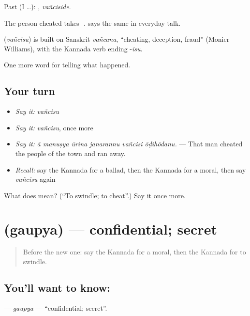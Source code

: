 Past (I …): , \emph{vañciside}.

The person cheated takes -.   says the same in everyday talk.

\begin{cousinweb}
\textbf{} (\emph{vañcisu}) is built on Sanskrit \emph{vañcana}, \textquotedblleft{}cheating, deception, fraud\textquotedblright{} (Monier-Williams), with the Kannada verb ending -\emph{isu}.
\end{cousinweb}

\begin{grammarlens}[title={What you've built}]
One more word for telling what happened.
\end{grammarlens}

\subsection*{Your turn}
\begin{itemize}
\raggedright
  \item \emph{Say it:} \emph{vañcisu}
  \item \emph{Say it:} \emph{vañcisu}, once more
  \item \emph{Say it:} \emph{ā manuṣya ūrina janarannu vañcisi ōḍihōdanu.} — That man cheated the people of the town and ran away.
  \item \emph{Recall:} say the Kannada for a ballad, then the Kannada for a moral, then say \emph{vañcisu} again
\end{itemize}

\begin{tcolorbox}[breakable,colback=teal!4,colframe=teal!35!black,title={Before you move on}]
What does  mean? (\textquotedblleft{}To swindle; to cheat\textquotedblright{}.) Say it once more.
\end{tcolorbox}
\section[\texorpdfstring{\kn{ಗೌಪ್ಯ} (gaupya)}{ಗೌಪ್ಯ (gaupya)}]{ (gaupya) — confidential; secret}

\label{lesson:KA-C357-gaupya}



\begin{quote}
Before the new one: say the Kannada for a moral, then the Kannada for to swindle.
\end{quote}

\subsection*{You'll want to know: }
\textbf{} — \emph{gaupya} — \textquotedblleft{}confidential; secret\textquotedblright{}.

